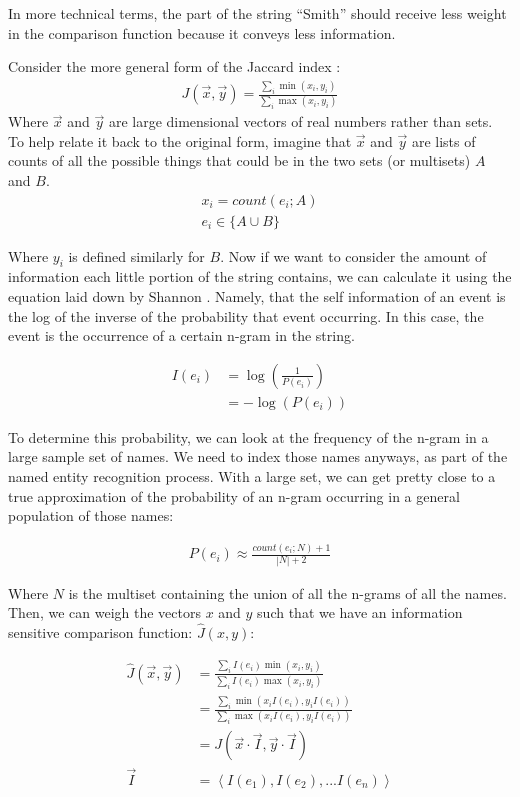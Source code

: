 \documentclass[11pt]{article}
\begin{document}
{In more technical terms, the part of the string ``Smith''
should receive less weight in the comparison function because
it conveys less information. 

Consider the more general form of the Jaccard index \cite{general}:
\begin{align*}
J(\vec{x},\vec{y}) = 
\frac{\sum_i \min(x_i, y_i)}{\sum_i \max(x_i, y_i)}
\end{align*}
Where $\vec{x}$ and $\vec{y}$ are large dimensional vectors of real numbers
rather than sets. To help relate it back to the original form, 
imagine that $\vec{x}$ and $\vec{y}$ are lists
of counts of all the possible things that could be in the two sets
(or multisets) $A$ and $B$.
\begin{align*}
x_i = count(e_i; A)\\
e_i \in \{A \cup B \}
\end{align*}

Where $y_i$ is defined similarly for $B$. Now if we want to consider the amount of information each little
portion of the string contains, we can calculate it
using the equation laid down by Shannon \cite{shannon}.
Namely, that the self information of an event is the log of the
inverse of the probability that event occurring. In this case,
the event is the occurrence of a certain n-gram in the string.

\begin{align*}
I(e_i) &= \log\left(\frac{1}{P(e_i)}\right)\\
&= -\log(P(e_i))
\end{align*}

To determine this probability, we can look at the frequency
of the n-gram in a large sample set of names.
We need to index those names anyways, as part of the named entity
recognition process. With a large set, we can get pretty close to a true 
approximation of the probability of an n-gram occurring in 
a general population of those names:

\begin{align*}
P(e_i) \approx \frac{count(e_i; N)+1}{|N|+2}
\end{align*}

Where $N$ is the multiset containing the union of all the n-grams of
all the names. 
Then, we can weigh the vectors $x$ and $y$ such that we have
an information sensitive comparison function: $\hat{J}(x,y)$:

\begin{align*}
\hat{J}(\vec{x},\vec{y}) 
&= \frac{
    \sum_i I(e_i)\min(x_i, y_i)
}{
    \sum_i I(e_i)\max(x_i, y_i)
}\\
&= \frac{
    \sum_i \min(x_iI(e_i), y_iI(e_i))
}{
    \sum_i \max(x_iI(e_i), y_iI(e_i))
}\\
&= J\left(\vec{x} \cdot \vec{I}, \vec{y} \cdot \vec{I} \right)\\
\vec{I} &= \left< I(e_1), I(e_2), ... I(e_n) \right>
\end{align*}

}
\end{document}
